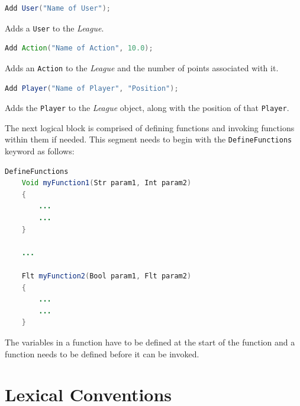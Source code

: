 \documentclass[12pt]{report}
\begin{document}
\begin{singlespace}
\begin{lstlisting}[language=Java,label=some-code,caption={Adding a \texttt{User}.}]
Add User("Name of User");
\end{lstlisting}
\end{singlespace}

Adds a \texttt{User} to the \textit{League}.

\begin{singlespace}
\begin{lstlisting}[language=Java,label=some-code,caption={Adding an \texttt{Action}.}]
Add Action("Name of Action", 10.0);
\end{lstlisting}
\end{singlespace}

Adds an \texttt{Action} to the \textit{League} and the number of points associated with it.

\begin{singlespace}
\begin{lstlisting}[language=Java,label=some-code,caption={Adding a \texttt{Player}.}]
Add Player("Name of Player", "Position");	
\end{lstlisting}
\end{singlespace}

Adds the \texttt{Player} to the \textit{League} object, along with the position of that \texttt{Player}.

The next logical block is comprised of defining functions and invoking functions within them if needed. This segment needs to begin with the \texttt{DefineFunctions} keyword as follows:

\begin{singlespace}
\begin{lstlisting}[language=Java,label=some-code,caption={Defining functions.}]
DefineFunctions
	Void myFunction1(Str param1, Int param2)
	{
		...
		...
	}

	...

	Flt myFunction2(Bool param1, Flt param2)
	{
		...
		...
	}
\end{lstlisting}
\end{singlespace}

The variables in a function have to be defined at the start of the function and a function needs to be defined before it can be invoked. 

\section{Lexical Conventions}
\end{document}
